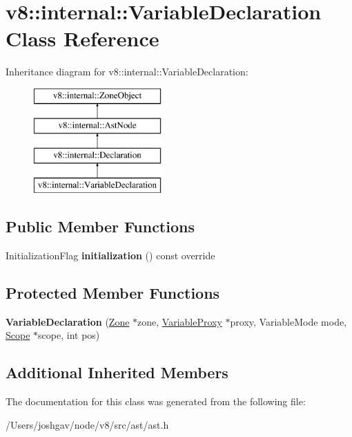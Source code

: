 \hypertarget{classv8_1_1internal_1_1_variable_declaration}{}\section{v8\+:\+:internal\+:\+:Variable\+Declaration Class Reference}
\label{classv8_1_1internal_1_1_variable_declaration}
Inheritance diagram for v8\+:\+:internal\+:\+:Variable\+Declaration\+:\begin{figure}[H]
\begin{center}
\leavevmode
\includegraphics[height=4.000000cm]{classv8_1_1internal_1_1_variable_declaration}
\end{center}
\end{figure}
\subsection*{Public Member Functions}
\begin{DoxyCompactItemize}
\item 
Initialization\+Flag {\bfseries initialization} () const  override\hypertarget{classv8_1_1internal_1_1_variable_declaration_a1d0600696596d02fa305e12988d12843}{}\label{classv8_1_1internal_1_1_variable_declaration_a1d0600696596d02fa305e12988d12843}

\end{DoxyCompactItemize}
\subsection*{Protected Member Functions}
\begin{DoxyCompactItemize}
\item 
{\bfseries Variable\+Declaration} (\hyperlink{classv8_1_1internal_1_1_zone}{Zone} $\ast$zone, \hyperlink{classv8_1_1internal_1_1_variable_proxy}{Variable\+Proxy} $\ast$proxy, Variable\+Mode mode, \hyperlink{classv8_1_1internal_1_1_scope}{Scope} $\ast$scope, int pos)\hypertarget{classv8_1_1internal_1_1_variable_declaration_ae72b333778a98c9521b30ca16f0647b7}{}\label{classv8_1_1internal_1_1_variable_declaration_ae72b333778a98c9521b30ca16f0647b7}

\end{DoxyCompactItemize}
\subsection*{Additional Inherited Members}


The documentation for this class was generated from the following file\+:\begin{DoxyCompactItemize}
\item 
/\+Users/joshgav/node/v8/src/ast/ast.\+h\end{DoxyCompactItemize}
